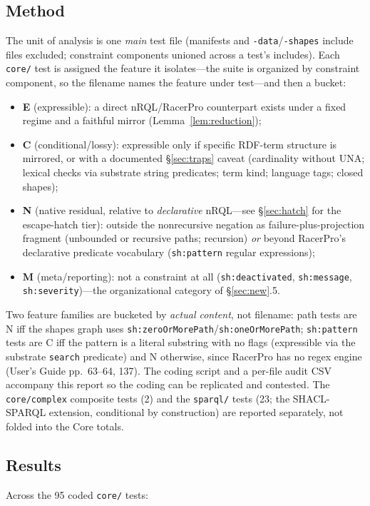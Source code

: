 \documentclass[11pt,letterpaper]{article}
\theoremstyle{definition}
\newcommand{\nrql}{nRQL}
\newcommand{\racer}{RacerPro}
\newcommand{\naf}{negation as failure}
\newcommand{\rdf}{RDF}
\begin{document}
\subsection{Method}
The unit of analysis is one \emph{main} test file (manifests and \texttt{-data}/\texttt{-shapes} include files excluded; constraint components unioned across a test's includes). Each \texttt{core/} test is assigned the feature it isolates---the suite is organized by constraint component, so the filename names the feature under test---and then a bucket:
\begin{itemize}[leftmargin=2em]
  \item \textbf{E} (expressible): a direct \nrql{}/\racer{} counterpart exists under a fixed regime and a faithful mirror (Lemma~\ref{lem:reduction});
  \item \textbf{C} (conditional/lossy): expressible only if specific \rdf{}-term structure is mirrored, or with a documented \S\ref{sec:traps} caveat (cardinality without UNA; lexical checks via substrate string predicates; term kind; language tags; closed shapes);
  \item \textbf{N} (native residual, relative to \emph{declarative} \nrql{}---see \S\ref{sec:hatch} for the escape-hatch tier): outside the nonrecursive \naf{}-plus-projection fragment (unbounded or recursive paths; recursion) \emph{or} beyond RacerPro's declarative predicate vocabulary (\texttt{sh:pattern} regular expressions);
  \item \textbf{M} (meta/reporting): not a constraint at all (\texttt{sh:deactivated}, \texttt{sh:message}, \texttt{sh:severity})---the organizational category of \S\ref{sec:new}.5.
\end{itemize}
Two feature families are bucketed by \emph{actual content}, not filename: path tests are N iff the shapes graph uses \texttt{sh:zeroOrMorePath}/\texttt{sh:oneOrMorePath}; \texttt{sh:pattern} tests are C iff the pattern is a literal substring with no flags (expressible via the substrate \texttt{search} predicate) and N otherwise, since RacerPro has no regex engine (User's Guide pp.~63--64, 137). The coding script and a per-file audit CSV accompany this report so the coding can be replicated and contested. The \texttt{core/complex} composite tests (2) and the \texttt{sparql/} tests (23; the SHACL-SPARQL extension, conditional by construction) are reported separately, not folded into the Core totals.

\subsection{Results}
Across the 95 coded \texttt{core/} tests:
\end{document}
